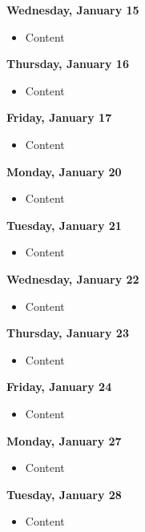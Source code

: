 \documentclass{article}
\begin{document}
\textbf{Wednesday, January 15}

\begin{itemize}
\item Content
\end{itemize}

\textbf{Thursday, January 16}

\begin{itemize}
\item Content
\end{itemize}

\textbf{Friday, January 17}

\begin{itemize}
\item Content
\end{itemize}

\textbf{Monday, January 20}

\begin{itemize}
\item Content
\end{itemize}

\textbf{Tuesday, January 21}

\begin{itemize}
\item Content
\end{itemize}

\textbf{Wednesday, January 22}

\begin{itemize}
\item Content
\end{itemize}

\textbf{Thursday, January 23}

\begin{itemize}
\item Content
\end{itemize}

\textbf{Friday, January 24}

\begin{itemize}
\item Content
\end{itemize}

\textbf{Monday, January 27}

\begin{itemize}
\item Content
\end{itemize}

\textbf{Tuesday, January 28}

\begin{itemize}
\item Content
\end{itemize}
\end{document}
